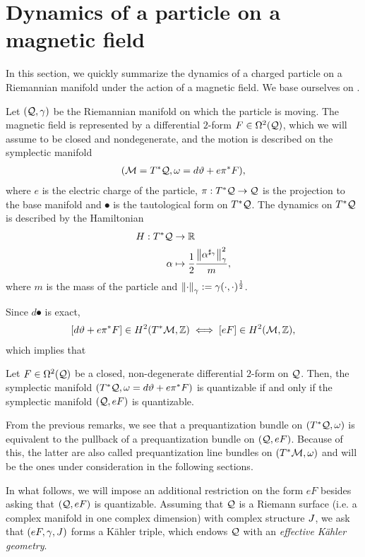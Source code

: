 \documentclass[notas.tex]{subfiles}
\begin{document}
\section{Dynamics of a particle on a magnetic field} \label{sec_gq_particle_magnetic} In this section, we quickly summarize the dynamics of a charged particle on a Riemannian manifold under the action of a magnetic field. We  base ourselves on \cite{tejero_prieto_holomorphic_2006}. 

Let $(\mathcal{Q}, \gamma)$ be the Riemannian manifold on which the particle is moving. The magnetic field is represented by a differential $2$-form $F \in \Omega^2(\mathcal{Q})$, which we will assume to be closed and nondegenerate, and the motion is described on the symplectic manifold
\begin{align*}
	(\mathcal{M} = T^*\mathcal{Q}, \omega = d\vartheta + e \pi^* F),
\end{align*}
where $e$ is the electric charge of the particle, $\pi: T^*\mathcal{Q} \to \mathcal{Q}$ is the projection to the base manifold and $\spot$ is the tautological form on $T^*\mathcal{Q}$. The dynamics on $T^*\mathcal{Q}$ is described by the Hamiltonian
\begin{align*}
	H: T^*\mathcal{Q} &\to \mathbb{R}\\
	\alpha &\mapsto \frac{1}{2}\frac{\left\lVert\alpha^{\sharp_\gamma}\right\rVert_\gamma^2}{m},
\end{align*}
where $m$ is the mass of the particle and $\left\lVert\cdot\right\rVert_\gamma := \gamma(\cdot, \cdot)^\frac{1}{2}$.

Since $d\spot$ is exact,
\begin{align*}
	\left[ d\vartheta + e \pi^* F \right ] \in H^2(T^*\mathcal{M}, \mathbb{Z}) \iff [ e F ] \in H^2(\mathcal{M}, \mathbb{Z}),
\end{align*}
which implies that
\begin{prop} \label{prop_magnetic_sform}
	Let $F \in \Omega^2(\mathcal{Q})$ be a closed, non-degenerate differential $2$-form on $\mathcal{Q}$. Then, the symplectic manifold $(T^*\mathcal{Q}, \omega = d\vartheta + e \pi^* F)$ is quantizable if and only if the symplectic manifold $(\mathcal{Q}, eF)$ is quantizable.
\end{prop}

From the previous remarks, we see that a prequantization bundle on $(T^*\mathcal{Q}, \omega)$ is equivalent to the pullback of a prequantization bundle on $(\mathcal{Q}, eF)$.  Because of this, the latter are also called prequantization line bundles on $(T^*\mathcal{M}, \omega)$ and will be the ones under consideration in the following sections.

\begin{rem} \label{rem_effective_geometry}
	In what follows, we will impose an additional restriction on the form $eF$ besides asking that $(\mathcal{Q}, eF)$ is quantizable. Assuming that $\mathcal{Q}$ is a Riemann surface (i.e. a complex manifold in one complex dimension) with complex structure $J$, we ask that $(eF, \gamma, J)$ forms a Kähler triple, which endows $\mathcal{Q}$ with an \emph{effective Kähler geometry}.
\end{rem}
\end{document}
